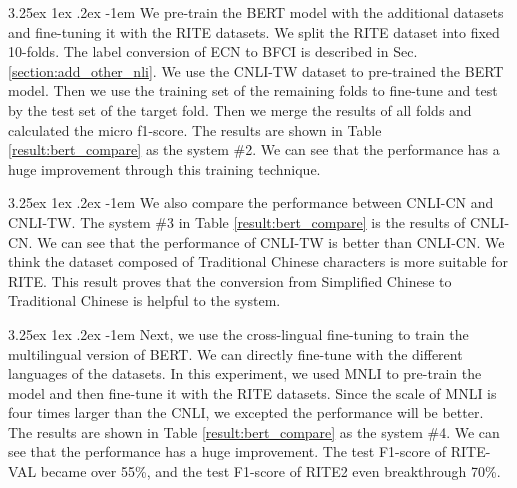 \documentclass[12pt]{article}
\makeatletter
\renewcommand\paragraph{\@startsection{paragraph}{5}{\z@}%
  {3.25ex \@plus1ex \@minus.2ex}%
  {-1em}%
  {\normalfont\normalsize\bfseries}}
\makeatother
\begin{document}
\begin{CJK*}{UTF8}{bkai}
\begin{spacing}{1.77}
\paragraph{}
We pre-train the BERT model with the additional datasets and fine-tuning it with the RITE datasets. We split the RITE dataset into fixed 10-folds. The label conversion of ECN to BFCI is described in Sec. \ref{section:add_other_nli}. We use the CNLI-TW dataset to pre-trained the BERT model. Then we use the training set of the remaining folds to fine-tune and test by the test set of the target fold. Then we merge the results of all folds and calculated the micro f1-score. The results are shown in Table \ref{result:bert_compare} as the system \#2. We can see that the performance has a huge improvement through this training technique.

\paragraph{}
We also compare the performance between CNLI-CN and CNLI-TW. The system \#3 in Table \ref{result:bert_compare} is the results of CNLI-CN. We can see that the performance of CNLI-TW is better than CNLI-CN. We think the dataset composed of Traditional Chinese characters is more suitable for RITE. This result proves that the conversion from Simplified Chinese to Traditional Chinese is helpful to the system.

\paragraph{}
Next, we use the cross-lingual fine-tuning to train the multilingual version of BERT. We can directly fine-tune with the different languages of the datasets. In this experiment, we used MNLI to pre-train the model and then fine-tune it with the RITE datasets. Since the scale of MNLI is four times larger than the CNLI, we excepted the performance will be better. The results are shown in Table \ref{result:bert_compare} as the system \#4. We can see that the performance has a huge improvement. The test F1-score of RITE-VAL became over 55\%, and the test F1-score of RITE2 even breakthrough 70\%.


\end{spacing}
\end{CJK*}
\end{document}
